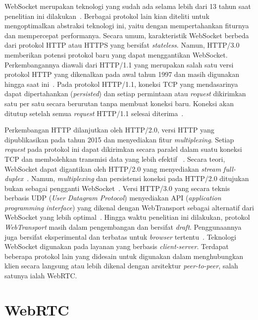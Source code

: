 WebSocket merupakan teknologi yang sudah ada selama lebih dari 13 tahun saat penelitian ini dilakukan~\citep{fette2011websocket}. Berbagai protokol lain kian diteliti untuk mengoptimalkan abstraksi teknologi ini, yaitu dengan mempertahankan fiturnya dan mempercepat performanya. Secara umum, karakteristik WebSocket berbeda dari protokol HTTP atau HTTPS yang bersifat \textit{stateless}. Namun, HTTP/3.0 memberikan potensi protokol baru yang dapat menggantikan WebSocket. Perkembangannya diawali dari HTTP/1.1 yang merupakan salah satu versi protokol HTTP yang dikenalkan pada awal tahun 1997 dan masih digunakan hingga saat ini~\citep{krishnamurthy1999key, fielding2015hypertext}. Pada protokol HTTP/1.1, koneksi TCP yang mendasarinya dapat dipertahankan (\textit{persisted}) dan setiap permintaan atau \textit{request} dikirimkan satu per satu secara berurutan tanpa membuat koneksi baru. Koneksi akan ditutup setelah semua \textit{request} HTTP/1.1 selesai diterima~\citep{fielding2015hypertext}.

Perkembangan HTTP dilanjutkan oleh HTTP/2.0, versi HTTP yang dipublikasikan pada tahun 2015 dan menyediakan fitur \textit{multiplexing}. Setiap \textit{request} pada protokol ini dapat dikirimkan secara paralel dalam suatu koneksi TCP dan membolehkan transmisi data yang lebih efektif ~\citep{belshe2015hypertext}. Secara teori, WebSocket dapat digantikan oleh HTTP/2.0 yang menyediakan \textit{stream} \textit{full-duplex}~\citep{stenberg2014http2}. Namun, \textit{multiplexing} dan persistensi koneksi pada HTTP/2.0 ditujukan bukan sebagai pengganti WebSocket~\citep{fietze2017http}. Versi HTTP/3.0 yang secara teknis berbasis UDP (\textit{User Datagram Protocol}) menyediakan API (\textit{application programming interface}) yang dikenal dengan WebTransport sebagai alternatif dari WebSocket yang lebih optimal~\citep{rfc9114, ietf-webtrans-http3-03}. Hingga waktu penelitian ini dilakukan, protokol \textit{WebTransport} masih dalam pengembangan dan bersifat \textit{draft}. Penggunaannya juga bersifat eksperimental dan terbatas untuk \textit{browser} tertentu~\citep{ietf-webtrans-http3-03}. Teknologi WebSocket digunakan pada layanan yang berbasis \textit{client-server}. Terdapat beberapa protokol lain yang didesain untuk digunakan dalam menghubungkan klien secara langsung atau lebih dikenal dengan arsitektur \textit{peer-to-peer}, salah satunya ialah WebRTC.


\section{WebRTC}

